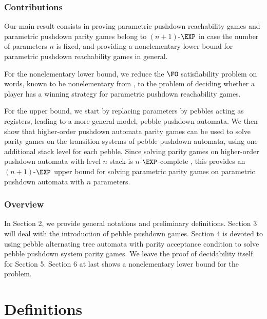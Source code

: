\documentclass[a4paper,UKenglish,cleveref, autoref, thm-restate]{lipics-v2021}
\newcommand{\MSO}{\textsc{MSO}}
\begin{document}
\fi

\subsubsection*{Contributions}


Our main result consists in
proving parametric pushdown reachability games
and parametric pushdown parity games belong to $(n+1)$-$\EXP$ in case the number of parameters
$n$ is fixed,
and providing a nonelementary lower bound for parametric pushdown reachability games in general.



	For the nonelementary lower bound,
we reduce the $\FO$ satisfiability problem on words, known to be nonelementary
from \cite{Sto74}, to the
problem of deciding whether a player has a winning strategy for parametric pushdown reachability games. 

	For the upper bound, we start by replacing parameters by pebbles acting as registers, leading to a more general model, pebble pushdown automata.
 We then show that higher-order pushdown automata parity games can be used to solve parity games on
 the transition systems of pebble pushdown automata,
using one additional stack level for each pebble.
 Since solving parity games on higher-order pushdown automata with level $n$ stack is $n$-$\EXP$-complete \cite{ Cach03, cachat2007complexity}, this provides an $(n+1)$-$\EXP$ upper bound for solving parametric parity games on parametric pushdown automata with $n$ parameters.



\subsubsection*{Overview}

In Section 2, we provide general notations and preliminary definitions. Section 3 will deal with the introduction of pebble pushdown games.
Section 4 is devoted to using pebble alternating tree automata with parity acceptance condition to solve pebble pushdown system parity games. We leave the proof of decidability itself  for Section 5.
Section 6 at last shows a nonelementary lower bound for the problem.




\section{Definitions}


\newcommand{\LCM}{\mathsf{LCM}}
\newcommand{\LOGSPACE}{\mathsf{LOGSPACE}}
\renewcommand{\MSO}{\mathsf{MSO}}
\newcommand{\SO}{\mathsf{SO}}
\end{document}
